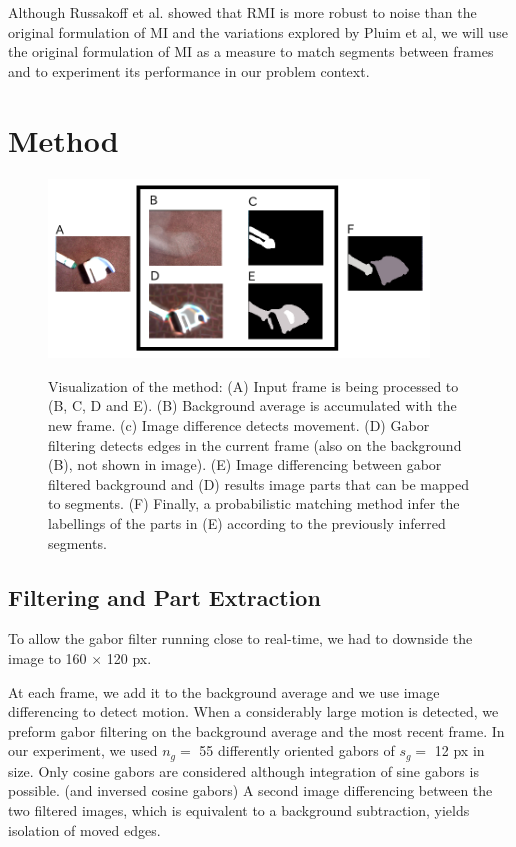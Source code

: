 \documentclass{article}
\begin{document}
Although Russakoff et al. showed that RMI is more robust to noise than the original formulation of MI and the variations explored by Pluim et al, we will use the original formulation of MI as a measure to match segments between frames and to experiment its performance in our problem context. 

\section{Method}

\begin{figure}[tbp]
\begin{center}
\caption{Visualization of the method: (A) Input frame is being processed to (B, C, D and E). (B) Background average is accumulated with the new frame. (c) Image difference detects movement. (D) Gabor filtering detects edges in the current frame (also on the background (B), not shown in image). (E) Image differencing between gabor filtered background and (D) results image parts that can be mapped to segments. (F) Finally, a probabilistic matching method infer the labellings of the parts in (E) according to the previously inferred segments.}
  \includegraphics[width=0.9\textwidth]{1}
\label{figure:model_seq}
\end{center}
\end{figure}

\subsection{Filtering and Part Extraction}

To allow the gabor filter running close to real-time, we had to downside the image to 160 $\times$ 120 px. 

At each frame, we add it to the background average and we use image differencing to detect motion. When a considerably large motion is detected, we preform gabor filtering on the background average and the most recent frame. In our experiment, we used $n_g=$ 55 differently oriented gabors of $s_g=$ 12 px in size. Only cosine gabors are considered although integration of sine gabors is possible. (and inversed cosine gabors) A second image differencing between the two filtered images, which is equivalent to a background subtraction, yields isolation of moved edges. 
\end{document}
